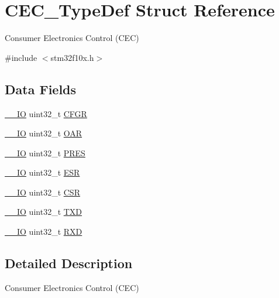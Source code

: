 \hypertarget{struct_c_e_c___type_def}{}\section{C\+E\+C\+\_\+\+Type\+Def Struct Reference}
\label{struct_c_e_c___type_def}


Consumer Electronics Control (C\+EC)  




{\ttfamily \#include $<$stm32f10x.\+h$>$}

\subsection*{Data Fields}
\begin{DoxyCompactItemize}
\item 
\mbox{\hyperlink{core__sc300_8h_aec43007d9998a0a0e01faede4133d6be}{\+\_\+\+\_\+\+IO}} uint32\+\_\+t \mbox{\hyperlink{struct_c_e_c___type_def_a26f1e746ccbf9c9f67e7c60e61085ec1}{C\+F\+GR}}
\item 
\mbox{\hyperlink{core__sc300_8h_aec43007d9998a0a0e01faede4133d6be}{\+\_\+\+\_\+\+IO}} uint32\+\_\+t \mbox{\hyperlink{struct_c_e_c___type_def_a117fc6b39bb86cb996234f8ff80414ed}{O\+AR}}
\item 
\mbox{\hyperlink{core__sc300_8h_aec43007d9998a0a0e01faede4133d6be}{\+\_\+\+\_\+\+IO}} uint32\+\_\+t \mbox{\hyperlink{struct_c_e_c___type_def_a97111895244af47cc1299eaccd77f275}{P\+R\+ES}}
\item 
\mbox{\hyperlink{core__sc300_8h_aec43007d9998a0a0e01faede4133d6be}{\+\_\+\+\_\+\+IO}} uint32\+\_\+t \mbox{\hyperlink{struct_c_e_c___type_def_a2b39f943954e0e7d177b511d9074a0b7}{E\+SR}}
\item 
\mbox{\hyperlink{core__sc300_8h_aec43007d9998a0a0e01faede4133d6be}{\+\_\+\+\_\+\+IO}} uint32\+\_\+t \mbox{\hyperlink{struct_c_e_c___type_def_a876dd0a8546697065f406b7543e27af2}{C\+SR}}
\item 
\mbox{\hyperlink{core__sc300_8h_aec43007d9998a0a0e01faede4133d6be}{\+\_\+\+\_\+\+IO}} uint32\+\_\+t \mbox{\hyperlink{struct_c_e_c___type_def_ad2f345b6426582a3e15d264d847cab63}{T\+XD}}
\item 
\mbox{\hyperlink{core__sc300_8h_aec43007d9998a0a0e01faede4133d6be}{\+\_\+\+\_\+\+IO}} uint32\+\_\+t \mbox{\hyperlink{struct_c_e_c___type_def_a597781fbfa1159b26609e4ce4be1be73}{R\+XD}}
\end{DoxyCompactItemize}


\subsection{Detailed Description}
Consumer Electronics Control (C\+EC) 

